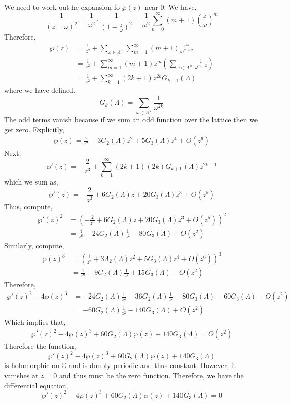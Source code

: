 \documentclass[12pt]{extarticle}
\newcommand{\C}{\mathbb{C}}
\theoremstyle{definition}
\begin{document}
We need to work out he expansion fo $\wp(z)$ near $0$. We have,
\[ \frac{1}{(z - \omega)^2} = \frac{1}{\omega^2} \cdot \frac{1}{(1 - \frac{z}{\omega})^2} = \frac{1}{\omega^2} \sum_{n = 0}^\infty (m + 1) \left( \frac{z}{\omega} \right)^m \]
Therefore,
\begin{align*}
\wp(z) &= \frac{1}{z^2} + \sum_{\omega \in \Lambda^\times} \sum_{m = 1}^\infty (m + 1) \frac{z^{m}}{\omega^{m + 2}} 
\\
& = \frac{1}{z^2} + \sum_{m = 1}^\infty (m + 1) z^m \left( \sum_{\omega \in \Lambda^\times} \frac{1}{\omega^{m+2}} \right) 
\\
& = \frac{1}{z^2} + \sum_{k = 1}^\infty (2 k + 1) z^{2k} G_{k+1}(\Lambda) 
\end{align*}
where we have defined,
\[ G_{k}(\Lambda) = \sum_{\omega \in \Lambda^\times} \frac{1}{\omega^{2k}} \] 
The odd terms vanish because if we sum an odd function over the lattice then we get zero. 
Explicitly,
\begin{align*}
\wp(z) = \frac{1}{z^2} + 3 G_2(\Lambda) z^2 + 5 G_3(\Lambda) z^4 + O(z^6) 
\end{align*}
Next,
\[ \wp'(z) = - \frac{2}{z^3} + \sum_{k = 1}^\infty (2 k + 1) (2k) G_{k+1}(\Lambda) z^{2k - 1} \]
which we sum as,
\[ \wp'(z) = - \frac{2}{z^3} + 6 G_2(\Lambda) z + 20 G_3(\Lambda) z^3 + O(z^5) \]
Thus, compute,
\begin{align*}
\wp'(z)^2 & = \left(  - \frac{2}{z^3} + 6 G_2(\Lambda) z + 20 G_3(\Lambda) z^3 + O(z^5) \right)^2 
\\
& = \frac{4}{z^6} - 24 G_2(\Lambda) \frac{1}{z^2} - 80 G_3(\Lambda) + O(z^2) 
\end{align*}
Similarly, compute,
\begin{align*}
\wp(z)^3 & = \left( \frac{1}{z^2} + 3 \Lambda_2(\Lambda) z^2 + 5 G_3(\Lambda) z^4 + O(z^6) \right)^3
\\
& = \frac{1}{z^6} + 9 G_2(\Lambda) \frac{1}{z^2} + 15 G_3(\Lambda) + O(z^2) 
\end{align*}
Therefore,
\begin{align*}
\wp'(z)^2 - 4 \wp(z)^3 & = - 24 G_2(\Lambda) \frac{1}{z^2} - 36 G_2(\Lambda) \frac{1}{z^2} - 80 G_3(\Lambda) - 60 G_3(\Lambda) + O(z^2) 
\\
& = - 60 G_2(\Lambda) \frac{1}{z^2} - 140 G_3(\Lambda) + O(z^2)
\end{align*}
Which implies that,
\begin{align*}
\wp'(z)^2 - 4 \wp(z)^3 + 60 G_2(\Lambda) \wp(z) + 140 G_3(\Lambda) = O(z^2)
\end{align*}
Therefore the function,
\[ \wp'(z)^2 - 4 \wp(z)^3 + 60 G_2(\Lambda) \wp(z) + 140 G_3(\Lambda) \]
is holomorphic on $\C$ and is doubly periodic and thus constant. However, it vanishes at $z = 0$ and thus must be the zero function. Therefore, we have the differential equation,
\[ \wp'(z)^2 - 4 \wp(z)^3 + 60 G_2(\Lambda) \wp(z) + 140 G_3(\Lambda)  = 0 \]
\end{document}
